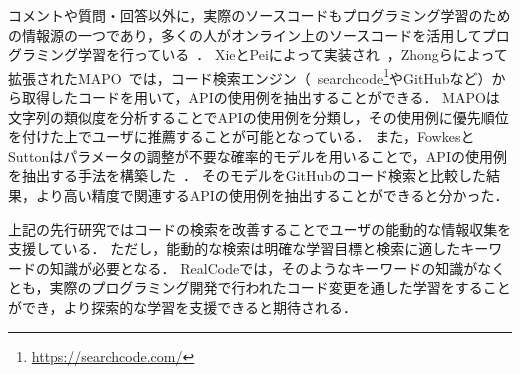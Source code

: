 %
%

コメントや質問・回答以外に，実際のソースコードもプログラミング学習のための情報源の一つであり，多くの人がオンライン上のソースコードを活用してプログラミング学習を行っている~\cite{Brandt:2009:TSO:1518701.1518944}．
XieとPeiによって実装され~\cite{MAPO}，Zhongらによって拡張されたMAPO~\cite{extended_MAPO}では，コード検索エンジン（~searchcode\footnote{\url{https://searchcode.com/}}やGitHubなど）から取得したコードを用いて，APIの使用例を抽出することができる．
MAPOは文字列の類似度を分析することでAPIの使用例を分類し，その使用例に優先順位を付けた上でユーザに推薦することが可能となっている．
また，FowkesとSuttonはパラメータの調整が不要な確率的モデルを用いることで，APIの使用例を抽出する手法を構築した~\cite{GitHubAPIMining}．
そのモデルをGitHubのコード検索と比較した結果，より高い精度で関連するAPIの使用例を抽出することができると分かった．



上記の先行研究ではコードの検索を改善することでユーザの能動的な情報収集を支援している．
ただし，能動的な検索は明確な学習目標と検索に適したキーワードの知識が必要となる．
RealCodeでは，そのようなキーワードの知識がなくとも，実際のプログラミング開発で行われたコード変更を通した学習をすることができ，より探索的な学習を支援できると期待される．


